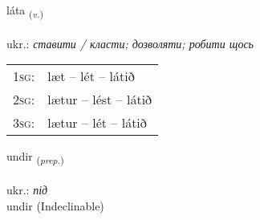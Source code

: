 \documentclass[frontgrid, backgrid]{flacards}\usepackage[]{graphicx}\usepackage[]{xcolor}
\begin{document}
\renewcommand{\blhead}{\vskip5pt {\small\bfseries\footnotesize Sagnorð | дієслово }}
\renewcommand{\bcfoot}{\vskip5pt \hspace{2pt}{\small\bfseries\footnotesize 1K}}


{láta \small{\textsubscript{(\textit{v.})}} \\[1ex] %
\textphonetic{[lauːta]} \\
ukr.: \emph{ставити / класти; дозволяти; робити щось} \\  [2ex]
\renewcommand*{\arraystretch}{0.8}
\begin{tabular}{p{1cm}l}
\textsc{1sg}: & læt -- lét -- látið \\ 
\textsc{2sg}: & lætur -- lést -- látið \\ 
\textsc{3sg}: & lætur -- lét -- látið \\ 
\end{tabular}
}


\renewcommand{\flhead}{\vskip5pt \fboxsep=0pt {\small\bfseries\footnotesize Forsetning | прийменник}}
\renewcommand{\fcfoot}{\vskip5pt \fboxsep=0pt \hspace{2pt}{\small\bfseries\footnotesize 1K}}

\renewcommand{\blhead}{\vskip5pt {\small\bfseries\footnotesize Forsetning | прийменник }}
\renewcommand{\bcfoot}{\vskip5pt \hspace{2pt}{\small\bfseries\footnotesize 1K}}


{undir \small{\textsubscript{(\textit{prep.})}} \\[1ex]
\textphonetic{[ʏntɪr]} \\
ukr.: \emph{під} \\  [2ex]
undir (Indeclinable)}

\renewcommand{\flhead}{\vskip5pt \fboxsep=0pt {\small\bfseries\footnotesize Sagnorð | дієслово}}
\renewcommand{\fcfoot}{\vskip5pt \fboxsep=0pt \hspace{2pt}{\small\bfseries\footnotesize 1K}}
\end{document}
